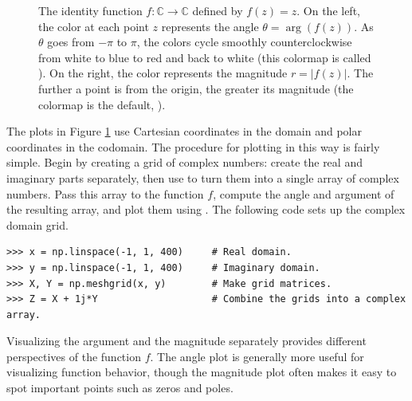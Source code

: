 \begin{figure}[H]
\begin{subfigure}{.49\textwidth}
\end{subfigure}
\caption{The identity function $f: \mathbb{C} \rightarrow \mathbb{C}$ defined by $f(z)=z$. On the left, the color at each point $z$ represents the angle $\theta = \arg(f(z))$. As $\theta$ goes from $-\pi$ to $\pi$, the colors cycle smoothly counterclockwise from white to blue to red and back to white (this colormap is called ). On the right, the color represents the magnitude $r = |f(z)|$. The further a point is from the origin, the greater its magnitude (the colormap is the default, ).
}
\label{fig:complex-identity-angle-mag}
\end{figure}

The plots in Figure \ref{fig:complex-identity-angle-mag} use Cartesian coordinates in the domain and polar coordinates in the codomain.
The procedure for plotting in this way is fairly simple.
Begin by creating a grid of complex numbers: create the real and imaginary parts separately, then use  to turn them into a single array of complex numbers.
Pass this array to the function $f$, compute the angle and argument of the resulting array, and plot them using .
The following code sets up the complex domain grid.

\begin{lstlisting}
>>> x = np.linspace(-1, 1, 400)     # Real domain.
>>> y = np.linspace(-1, 1, 400)     # Imaginary domain.
>>> X, Y = np.meshgrid(x, y)        # Make grid matrices.
>>> Z = X + 1j*Y                    # Combine the grids into a complex array.
\end{lstlisting}

Visualizing the argument and the magnitude separately provides different perspectives of the function $f$.
The angle plot is generally more useful for visualizing function behavior, though the magnitude plot often makes it easy to spot important points such as zeros and poles.

